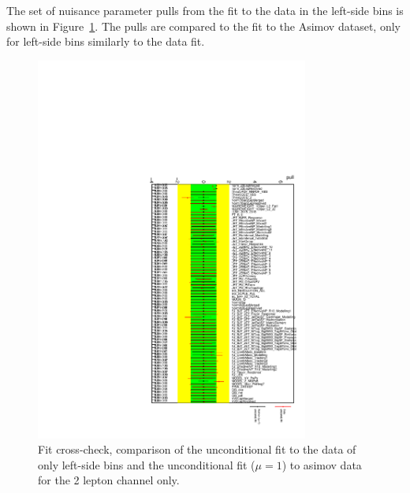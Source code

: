 The set of nuisance parameter pulls from the fit to the data in the left-side bins is shown in Figure~\ref{fig:fit_2lep_pull}. The pulls are compared to the fit to the Asimov dataset, only for left-side bins similarly to the data fit. 
\begin{figure}[ht]
      \centering
        \includegraphics[width=0.8\textwidth]{figures/2lep/FitResults/fit_2lep_pull.pdf}
        \caption{Fit cross-check, comparison of the unconditional fit to the data of only left-side bins and the unconditional fit ($\mu=1$) to asimov data for the 2 lepton channel only.}
       \label{fig:fit_2lep_pull}
\end{figure}

